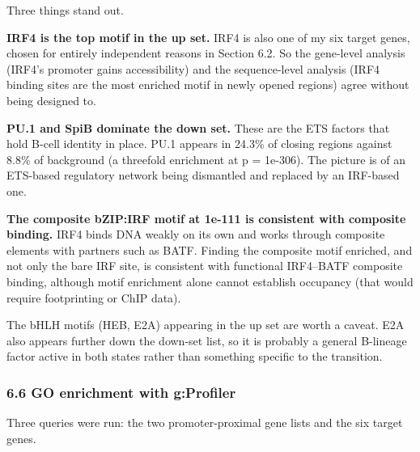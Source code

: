 \documentclass[
  11pt,
  a4paper,
]{article}
\begin{document}
Three things stand out.

\textbf{IRF4 is the top motif in the up set.} IRF4 is also one of my six
target genes, chosen for entirely independent reasons in Section 6.2. So
the gene-level analysis (IRF4's promoter gains accessibility) and the
sequence-level analysis (IRF4 binding sites are the most enriched motif
in newly opened regions) agree without being designed to.

\textbf{PU.1 and SpiB dominate the down set.} These are the ETS factors
that hold B-cell identity in place. PU.1 appears in 24.3\% of closing
regions against 8.8\% of background (a threefold enrichment at p =
1e-306). The picture is of an ETS-based regulatory network being
dismantled and replaced by an IRF-based one.

\textbf{The composite bZIP:IRF motif at 1e-111 is consistent with
composite binding.} IRF4 binds DNA weakly on its own and works through
composite elements with partners such as BATF. Finding the composite
motif enriched, and not only the bare IRF site, is consistent with
functional IRF4--BATF composite binding, although motif enrichment alone
cannot establish occupancy (that would require footprinting or ChIP
data).

The bHLH motifs (HEB, E2A) appearing in the up set are worth a caveat.
E2A also appears further down the down-set list, so it is probably a
general B-lineage factor active in both states rather than something
specific to the transition.

\hypertarget{go-enrichment-with-gprofiler}{%
\subsubsection{6.6 GO enrichment with
g:Profiler}\label{go-enrichment-with-gprofiler}}

Three queries were run: the two promoter-proximal gene lists and the six
target genes.
\end{document}
